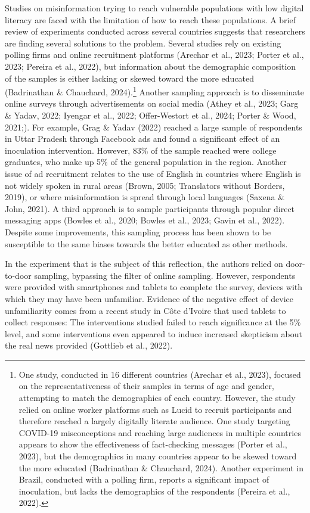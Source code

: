 \documentclass[authordate, empirical]{jote-new-article}
\begin{document}
	Studies on misinformation trying to reach vulnerable populations with low digital literacy are faced with the limitation of how to reach these populations. A brief review of experiments conducted across several countries suggests that researchers are finding several solutions to the problem. Several studies rely on existing polling firms and online recruitment platforms (Arechar et al., 2023; Porter et al., 2023; Pereira et al., 2022), but information about the demographic composition of the samples is either lacking or skewed toward the more educated (Badrinathan \& Chauchard, 2024).\footnote{ One study, conducted in 16 different countries (Arechar et al., 2023), focused on the representativeness of their samples in terms of age and gender, attempting to match the demographics of each country. However, the study relied on online worker platforms such as Lucid to recruit participants and therefore reached a largely digitally literate audience. One study targeting COVID-19 misconceptions and reaching large audiences in multiple countries appears to show the effectiveness of fact-checking messages (Porter et al., 2023), but the demographics in many countries appear to be skewed toward the more educated (Badrinathan \& Chauchard, 2024). Another experiment in Brazil, conducted with a polling firm, reports a significant impact of inoculation, but lacks the demographics of the respondents (Pereira et al., 2022).} Another sampling approach is to disseminate online surveys through advertisements on social media (Athey et al., 2023; Garg \& Yadav, 2022; Iyengar et al., 2022; Offer-Westort et al., 2024; Porter \& Wood, 2021;). For example, Grag \& Yadav (2022) reached a large sample of respondents in Uttar Pradesh through Facebook ads and found a significant effect of an inoculation intervention. However, 83\% of the sample reached were college graduates, who make up 5\% of the general population in the region. Another issue of ad recruitment relates to the use of English in countries where English is not widely spoken in rural areas (Brown, 2005; Translators without Borders, 2019), or where misinformation is spread through local languages (Saxena \& John, 2021). A third approach is to sample participants through popular direct messaging apps (Bowles et al., 2020; Bowles et al., 2023; Gavin et al., 2022). Despite some improvements, this sampling process has been shown to be susceptible to the same biases towards the better educated as other methods.



	In the experiment that is the subject of this reflection, the authors relied on door-to-door sampling, bypassing the filter of online sampling. However, respondents were provided with smartphones and tablets to complete the survey, devices with which they may have been unfamiliar. Evidence of the negative effect of device unfamiliarity comes from a recent study in Côte d'Ivoire that used tablets to collect responses: The interventions studied failed to reach significance at the 5\% level, and some interventions even appeared to induce increased skepticism about the real news provided (Gottlieb et al., 2022).
\end{document}
